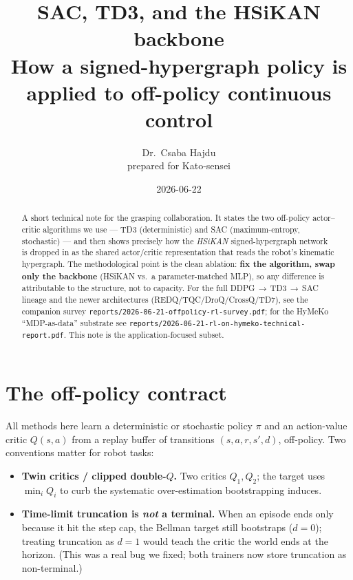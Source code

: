 \documentclass[11pt]{article}
\title{\textbf{SAC, TD3, and the HSiKAN backbone}\\[2pt]
  \large How a signed-hypergraph policy is applied to off-policy continuous control}
\author{Dr.\ Csaba Hajdu \\[2pt] \normalsize prepared for Kato-sensei}
\date{2026-06-22}
\newcommand{\code}[1]{\texttt{\small #1}}
\begin{document}
\maketitle

\begin{abstract}
\noindent A short technical note for the grasping collaboration. It states the two off-policy actor--critic
algorithms we use --- TD3 (deterministic) and SAC (maximum-entropy, stochastic) --- and then shows precisely
how the \emph{HSiKAN} signed-hypergraph network is dropped in as the shared actor/critic representation that
reads the robot's kinematic hypergraph. The methodological point is the clean ablation: \textbf{fix the
algorithm, swap only the backbone} (HSiKAN vs.\ a parameter-matched MLP), so any difference is attributable to
the structure, not to capacity. For the full DDPG\,$\to$\,TD3\,$\to$\,SAC lineage and the newer architectures
(REDQ/TQC/DroQ/CrossQ/TD7), see the companion survey \code{reports/2026-06-21-offpolicy-rl-survey.pdf}; for the
HyMeKo ``MDP-as-data'' substrate see \code{reports/2026-06-21-rl-on-hymeko-technical-report.pdf}. This note is
the application-focused subset.
\end{abstract}

\section{The off-policy contract}
All methods here learn a deterministic or stochastic policy $\pi$ and an action-value critic $Q(s,a)$ from a
replay buffer of transitions $(s,a,r,s',d)$, off-policy. Two conventions matter for robot tasks:
\begin{itemize}[nosep]
  \item \textbf{Twin critics / clipped double-$Q$.} Two critics $Q_1,Q_2$; the target uses
        $\min_i Q_i$ to curb the systematic over-estimation bootstrapping induces.
  \item \textbf{Time-limit truncation is \emph{not} a terminal.} When an episode ends only because it hit the
        step cap, the Bellman target still bootstraps ($d=0$); treating truncation as $d=1$ would teach the
        critic the world ends at the horizon. (This was a real bug we fixed; both trainers now store
        truncation as non-terminal.)
\end{itemize}
\end{document}
